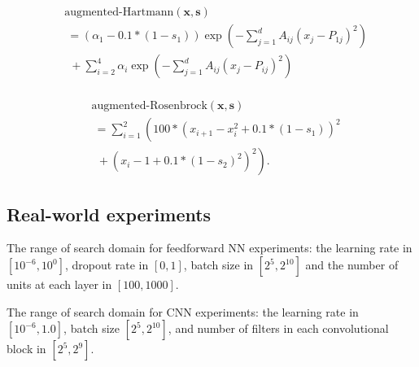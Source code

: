 \documentclass[letterpaper]{article}
\newcommand{\x}{\mathbf{x}}
\newcommand{\s}{\mathbf{s}}
\theoremstyle{definition}
\numberwithin{equation}{section}
\begin{document}
\begin{equation*}
\begin{split}
&\text{augmented-Hartmann}(\x, \s) \\
&\ = \left(\alpha_1-0.1*(1-s_1)\right) \exp{\left(-\sum_{j=1}^d A_{ij} (x_j - P_{1j})^2\right)}\\
&\ \ + \sum_{i=2}^{4} \alpha_i \exp{\left(-\sum_{j=1}^d A_{ij} (x_j - P_{ij})^2\right)}\\
\end{split}
\end{equation*}

\begin{equation*}
\begin{split}
&\text{augmented-Rosenbrock}(\x, \s) \\
&\  = \sum_{i=1}^2 \left(100*(x_{i+1}-x_i^2 + 0.1*(1-s_1))^2\right.\\
&\ \  + \left.\left(x_i-1+0.1*(1-s_2)^2\right)^2\right).
\end{split}
\end{equation*}

\subsection{Real-world experiments}
The range of search domain for feedforward NN experiments: the learning rate in $[10^{-6}, 10^0]$, dropout rate in $[0, 1]$, batch size in $[2^5, 2^{10}]$ and the number of units at each layer in $[100, 1000]$.

The range of search domain for CNN experiments: the learning rate in $[10^{-6}, 1.0]$, batch size $[2^5, 2^{10}]$, and number of filters in each convolutional block in $[2^5, 2^9]$. 




\end{document}
